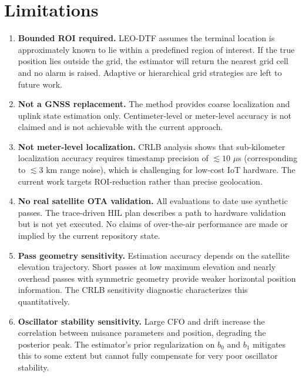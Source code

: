 \section{Limitations}\label{sec:limitations}

\begin{enumerate}
  \item \textbf{Bounded ROI required.}  LEO-DTF assumes the terminal location
        is approximately known to lie within a predefined region of interest.
        If the true position lies outside the grid, the estimator will return
        the nearest grid cell and no alarm is raised.  Adaptive or hierarchical
        grid strategies are left to future work.

  \item \textbf{Not a GNSS replacement.}  The method provides coarse
        localization and uplink state estimation only.  Centimeter-level or
        meter-level accuracy is not claimed and is not achievable with the
        current approach.

  \item \textbf{Not meter-level localization.}  CRLB analysis shows that
        sub-kilometer localization accuracy requires timestamp precision of
        $\lesssim 10$ $\mu$s (corresponding to $\lesssim 3$ km range noise), which
        is challenging for low-cost IoT hardware.  The current work targets
        ROI-reduction rather than precise geolocation.

  \item \textbf{No real satellite OTA validation.}  All evaluations to date
        use synthetic passes.  The trace-driven HIL plan describes a path to
        hardware validation but is not yet executed.  No claims of
        over-the-air performance are made or implied by the current repository
        state.

  \item \textbf{Pass geometry sensitivity.}  Estimation accuracy depends on
        the satellite elevation trajectory.  Short passes at low maximum
        elevation and nearly overhead passes with symmetric geometry provide
        weaker horizontal position information.  The CRLB sensitivity diagnostic
        characterizes this quantitatively.

  \item \textbf{Oscillator stability sensitivity.}  Large CFO and drift increase
        the correlation between nuisance parameters and position, degrading
        the posterior peak.  The estimator's prior regularization on $b_0$ and
        $b_1$ mitigates this to some extent but cannot fully compensate for
        very poor oscillator stability.


\end{enumerate}
